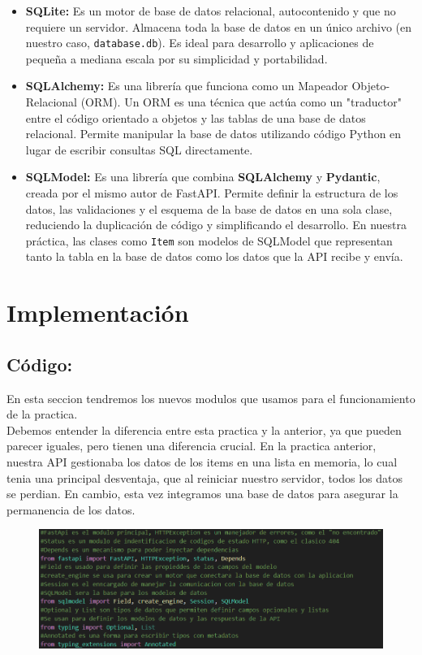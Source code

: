 \documentclass[12pt]{article}
\begin{document}
\begin{itemize}
    \item \textbf{SQLite:} Es un motor de base de datos relacional, autocontenido y que no requiere un servidor. Almacena toda la base de datos en un único archivo (en nuestro caso, \texttt{database.db}). Es ideal para desarrollo y aplicaciones de pequeña a mediana escala por su simplicidad y portabilidad.
    
    \item \textbf{SQLAlchemy:} Es una librería que funciona como un Mapeador Objeto-Relacional (ORM). Un ORM es una técnica que actúa como un "traductor" entre el código orientado a objetos y las tablas de una base de datos relacional. Permite manipular la base de datos utilizando código Python en lugar de escribir consultas SQL directamente.
    
    \item \textbf{SQLModel:} Es una librería que combina \textbf{SQLAlchemy} y \textbf{Pydantic}, creada por el mismo autor de FastAPI. Permite definir la estructura de los datos, las validaciones y el esquema de la base de datos en una sola clase, reduciendo la duplicación de código y simplificando el desarrollo. En nuestra práctica, las clases como \texttt{Item} son modelos de SQLModel que representan tanto la tabla en la base de datos como los datos que la API recibe y envía.\cite{ref4}
\end{itemize}

\section{Implementación}
\subsection*{Código:}
En esta seccion tendremos los nuevos modulos que usamos para el funcionamiento de la practica.\\

Debemos entender la diferencia entre esta practica y la anterior, ya que pueden parecer iguales, pero tienen una diferencia crucial. 
En la practica anterior, nuestra API gestionaba los datos de los items en una lista en memoria, lo cual tenia una principal desventaja,
que al reiniciar nuestro servidor, todos los datos se perdian. 
En cambio, esta vez integramos una base de datos para asegurar la permanencia de los datos.

\begin{figure}[H]
    \centering
    \includegraphics[width=1\textwidth]{Imagenes/Imagen WEB 3_1.png}
\end{figure}
\end{document}
